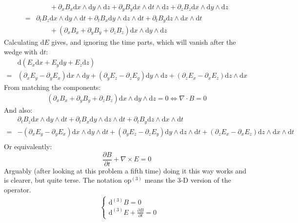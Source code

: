 \documentclass[12pt,a4]{article}
\newcommand{\e}{\mathrm{d}}
\begin{document}
\begin{enumerate}
\begin{enumerate}
\begin{align*}
            & \qquad + \partial_x B_x \e x \wedge \e y \wedge \e z + \partial_y B_y \e x \wedge \e t \wedge \e z + \partial_z B_z \e x \wedge \e y \wedge \e z\\
          = & \partial_t B_z  \e x \wedge \e y \wedge \e t + \partial_t B_x  \e y \wedge \e z \wedge \e t + \partial_t B_y  \e z \wedge \e x \wedge \e t \\
            & \qquad + (\partial_x B_x + \partial_y B_y + \partial_z B_z )\e x \wedge \e y \wedge \e z
        \end{align*}
        Calculating $\e E$ gives, and ignoring the time parts, which will vanish after the wedge with $\e t$:
        \begin{align*}
          &\e (E_x \e x + E_y \e y + E_z \e z) \\
          = &(\partial_x E_y - \partial_y E_x) \e x \wedge \e y + (\partial_y  E_z - \partial_z  E_y)\e y \wedge \e z + (\partial_z  E_x - \partial_x  E_z)\e z \wedge \e x
        \end{align*}
        From matching the components:
        \begin{align*}
            (\partial_x B_x + \partial_y B_y + \partial_z B_z )\e x \wedge \e y \wedge \e z = 0 \Leftrightarrow \nabla \cdot B = 0
        \end{align*}
        And also:
        \begin{align*}
          &\partial_t B_z  \e x \wedge \e y \wedge \e t + \partial_t B_x  \e y \wedge \e z \wedge \e t + \partial_t B_y  \e z \wedge \e x \wedge \e t \\
          =& - (\partial_x E_y - \partial_y E_x) \e x \wedge \e y \wedge \e t + (\partial_y  E_z - \partial_z  E_y)\e y \wedge \e z \wedge \e t + (\partial_z  E_x - \partial_x  E_z)\e z \wedge \e x \wedge \e t \\
        \end{align*}
        Or equivalently:
        \begin{equation*}
          \frac{\partial B}{\partial t} + \nabla \times E = 0
        \end{equation*}
        Arguably (after looking at this problem a fifth time) doing it this way works and is clearer, but quite terse.
        The notation $\text{op}^{(3)}$ means the 3-D version of the operator.
        \begin{align*}
         &\begin{cases}
            \e ^{(3)} B = 0\\
            \e ^{(3)} E + \frac{\partial B}{\partial t} = 0

\end{cases}
\end{align*}
\end{enumerate}
\end{enumerate}
\end{document}
